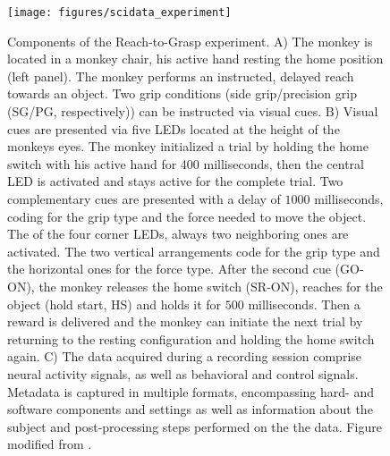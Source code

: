 \begin{figure}[!ht]
\centering
\texttt{[image: figures/scidata\_experiment]}
\caption[Components of the Reach-to-Grasp experiment]{Components of the Reach-to-Grasp experiment. A) The monkey is located in a monkey chair, his active hand resting the home position (left panel). The monkey performs an instructed, delayed reach towards an object. Two grip conditions (side grip/precision grip (SG/PG, respectively)) can be instructed via visual cues. B) Visual cues are presented via five LEDs located at the height of the monkeys eyes. The monkey initialized a trial by holding the home switch with his active hand for $400$ milliseconds, then the central LED is activated and stays active for the complete trial. Two complementary cues are presented with a delay of $1000$ milliseconds, coding for the grip type and the force needed to move the object. The of the four corner LEDs, always two neighboring ones are activated. The two vertical arrangements code for the grip type and the horizontal ones for the force type. After the second cue (GO-ON), the monkey releases the home switch (SR-ON), reaches for the object (hold start, HS) and holds it for $500$ milliseconds. Then a reward is delivered and the monkey can initiate the next trial by returning to the resting configuration and holding the home switch again. C) The data acquired during a recording session comprise neural activity signals, as well as behavioral and control signals. Metadata is captured in multiple formats, encompassing hard- and software components and settings as well as information about the subject and post-processing steps performed on the the data. Figure modified from \citet{Brochier_2018}.}
\label{fig:r2g_introduction}
\end{figure}

